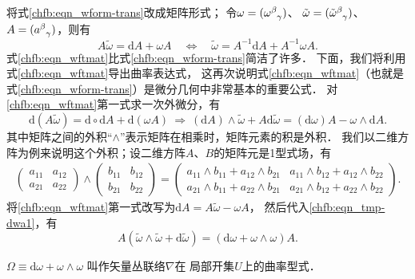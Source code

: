 将式\eqref{chfb:eqn_wform-trans}改成矩阵形式；
令$\omega=(\omega_{\hphantom{\alpha}\gamma}^\beta)$、
$\tilde{\omega}=(\tilde{\omega}_{\hphantom{\alpha}\gamma}^\beta)$、
$A=(a_{\hphantom{\alpha}\gamma}^\beta)$，则有
\begin{equation}\label{chfb:eqn_wftmat}
    A \tilde{\omega}= \mathrm{d}A + \omega A
    \quad \Leftrightarrow \quad
    \tilde{\omega}= A^{-1} \mathrm{d}A + A^{-1}\omega A .
\end{equation}
式\eqref{chfb:eqn_wftmat}比式\eqref{chfb:eqn_wform-trans}简洁了许多．
下面，我们将利用式\eqref{chfb:eqn_wftmat}导出曲率表达式，
这再次说明式\eqref{chfb:eqn_wftmat}（也就是
式\eqref{chfb:eqn_wform-trans}）是微分几何中非常基本的重要公式．
对\eqref{chfb:eqn_wftmat}第一式求一次外微分，有
\begin{equation}\label{chfb:eqn_tmp-dwa1}
    \mathrm{d} (A \tilde{\omega})= \mathrm{d}\circ\mathrm{d}A + \mathrm{d}(\omega A)
    \ \Rightarrow \
    (\mathrm{d} A)\wedge \tilde{\omega}+ A \mathrm{d} \tilde{\omega} 
    =(\mathrm{d}\omega) A - \omega\wedge \mathrm{d} A .
\end{equation}
其中矩阵之间的外积“$\wedge$”表示矩阵在相乘时，矩阵元素的积是外积．
我们以二维方阵为例来说明这个外积；设二维方阵$A$、$B$的矩阵元是1型式场，有
\begin{align*}
	\begin{pmatrix}
		a_{11} & a_{12} \\ a_{21} & a_{22} 
	\end{pmatrix} \wedge
	\begin{pmatrix}
		b_{11} & b_{12} \\ b_{21} & b_{22} 
	\end{pmatrix} 
	=\begin{pmatrix}
		a_{11}\wedge b_{11} + a_{12}\wedge b_{21} & a_{11}\wedge b_{12} + a_{12}\wedge b_{22} \\ 
		a_{21}\wedge b_{11} + a_{22}\wedge b_{21} & a_{21}\wedge b_{12} + a_{22}\wedge b_{22}
	\end{pmatrix}.
\end{align*}
将\eqref{chfb:eqn_wftmat}第一式改写为$\mathrm{d} A = A \tilde{\omega}-\omega A $，
然后代入\eqref{chfb:eqn_tmp-dwa1}，有
\begin{equation}\label{chfb:eqn_ATheta}
    A (\tilde{\omega}\wedge \tilde{\omega} + \mathrm{d} \tilde{\omega} )
    =(\mathrm{d}\omega +  \omega\wedge\omega )A .
\end{equation}


\begin{definition}\label{chfb:def_Curvature}
    $\Omega \equiv \mathrm{d}\omega +  \omega\wedge\omega$ 叫作矢量丛联络$\nabla$在
    局部开集$U$上的{\heiti 曲率型式}．
\end{definition}

